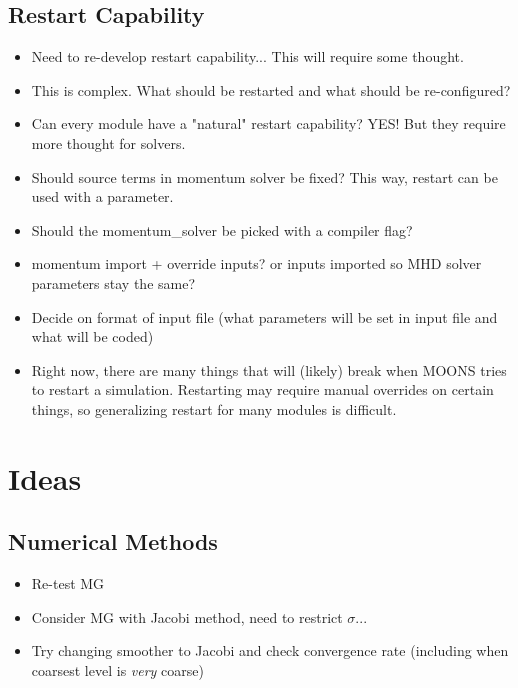\documentclass[11pt]{article}
\begin{document}
\subsection{Restart Capability}
\begin{itemize}
\setlength\itemsep{-1em}
\item Need to re-develop restart capability... This will require some thought.
\item This is complex. What should be restarted and what should be re-configured?
\item Can every module have a "natural" restart capability? YES! \Checkmark But they require more thought for solvers.
\item Should source terms in momentum solver be fixed? This way, restart can be used with a parameter.
\item Should the momentum\_solver be picked with a compiler flag?
\item momentum import + override inputs? or inputs imported so MHD solver parameters stay the same?
\item Decide on format of input file (what parameters will be set in input file and what will be coded)
\item Right now, there are many things that will (likely) break when MOONS tries to restart a simulation. Restarting may require manual overrides on certain things, so generalizing restart for many modules is difficult.
\end{itemize}

\section{Ideas}

\subsection{Numerical Methods}
\begin{itemize}
\setlength\itemsep{-1em}
\item Re-test MG
\item Consider MG with Jacobi method, need to restrict $\sigma$...
\item Try changing smoother to Jacobi and check convergence rate (including when coarsest level is \textit{very} coarse)
\end{itemize}
\end{document}
